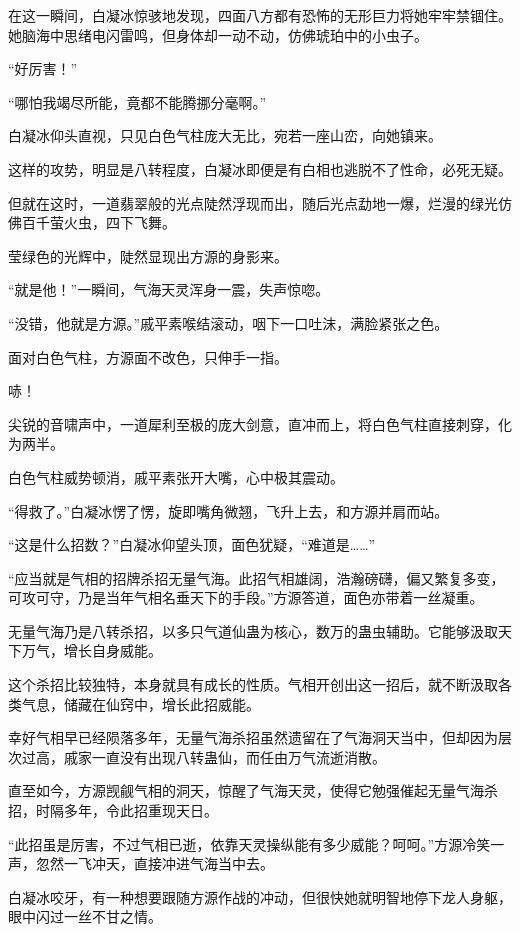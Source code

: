 \begin{this_body}
在这一瞬间，白凝冰惊骇地发现，四面八方都有恐怖的无形巨力将她牢牢禁锢住。她脑海中思绪电闪雷鸣，但身体却一动不动，仿佛琥珀中的小虫子。

“好厉害！”

“哪怕我竭尽所能，竟都不能腾挪分毫啊。”

白凝冰仰头直视，只见白色气柱庞大无比，宛若一座山峦，向她镇来。

这样的攻势，明显是八转程度，白凝冰即便是有白相也逃脱不了性命，必死无疑。

但就在这时，一道翡翠般的光点陡然浮现而出，随后光点勐地一爆，烂漫的绿光仿佛百千萤火虫，四下飞舞。

莹绿色的光辉中，陡然显现出方源的身影来。

“就是他！”一瞬间，气海天灵浑身一震，失声惊唿。

“没错，他就是方源。”戚平素喉结滚动，咽下一口吐沫，满脸紧张之色。

面对白色气柱，方源面不改色，只伸手一指。

哧！

尖锐的音啸声中，一道犀利至极的庞大剑意，直冲而上，将白色气柱直接刺穿，化为两半。

白色气柱威势顿消，戚平素张开大嘴，心中极其震动。

“得救了。”白凝冰愣了愣，旋即嘴角微翘，飞升上去，和方源并肩而站。

“这是什么招数？”白凝冰仰望头顶，面色犹疑，“难道是……”

“应当就是气相的招牌杀招无量气海。此招气相雄阔，浩瀚磅礴，偏又繁复多变，可攻可守，乃是当年气相名垂天下的手段。”方源答道，面色亦带着一丝凝重。

无量气海乃是八转杀招，以多只气道仙蛊为核心，数万的蛊虫辅助。它能够汲取天下万气，增长自身威能。

这个杀招比较独特，本身就具有成长的性质。气相开创出这一招后，就不断汲取各类气息，储藏在仙窍中，增长此招威能。

幸好气相早已经陨落多年，无量气海杀招虽然遗留在了气海洞天当中，但却因为层次过高，戚家一直没有出现八转蛊仙，而任由万气流逝消散。

直至如今，方源觊觎气相的洞天，惊醒了气海天灵，使得它勉强催起无量气海杀招，时隔多年，令此招重现天日。

“此招虽是厉害，不过气相已逝，依靠天灵操纵能有多少威能？呵呵。”方源冷笑一声，忽然一飞冲天，直接冲进气海当中去。

白凝冰咬牙，有一种想要跟随方源作战的冲动，但很快她就明智地停下龙人身躯，眼中闪过一丝不甘之情。


\end{this_body}
